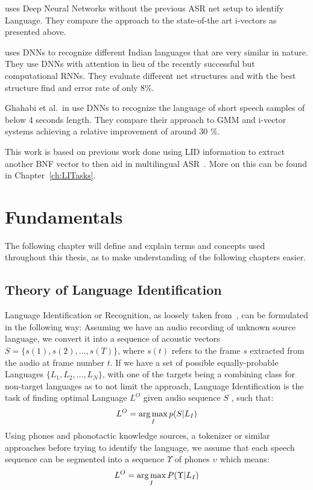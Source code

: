 \cite{6854622} uses Deep Neural Networks without the previous ASR net setup to identify Language. They compare the approach to the state-of-the art i-vectors as presented above.

\cite{K.V.+2016} uses DNNs to recognize different Indian languages that are very similar in nature. They use DNNs with attention in lieu of the recently successful but computational RNNs. They evaluate different net structures and with the best structure find and error rate of only 8\%.

Ghahabi et al.~in \cite{Ghahabi+2016} use DNNs to recognize the language of short speech samples of below 4 seconds length. They compare their approach to GMM and i-vector systems achieving a relative improvement of around 30 \%.

This work is based on previous work done using LID information to extract another BNF vector to then aid in multilingual ASR~\cite{Mueller2016b}. More on this can be found in Chapter~\ref{ch:LITasks}.

\chapter{Fundamentals}
\label{ch:fund}

The following chapter will define and explain terms and concepts used throughout this thesis, as to make understanding of the following chapters easier.

\section{Theory of Language Identification}

Language Identification or Recognition, as loosely taken from~\cite{6451097}, can be formulated in the following way: Assuming we have an audio recording of unknown source language, we convert it into a sequence of acoustic vectors \(S = \{ s(1), s(2), \dots , s(T)\}\), where \(s(t)\) refers to the frame \(s\) extracted from the audio at frame number \(t\). If we have a set of possible equally-probable Languages \(\{L_1,L_2,\dots,L_N\}\), with one of the targets being a combining class for non-target languages as to not limit the approach, Language Identification is the task of finding optimal Language \(L^O\) given audio sequence \(S\) , such that:
\begin{equation}
L^O = \operatorname*{arg\,max}_I p(S|L_I)
\end{equation}
Using phones and phonotactic knowledge sources, a tokenizer or similar approaches before trying to identify the language, we assume that each speech sequence can be segmented into a sequence \(\Upsilon\) of phones \(\upsilon\) which means:
\begin{equation}
\label{eq:phones}
L^O = \operatorname*{arg\,max}_I P(\Upsilon|L_I)
\end{equation}

